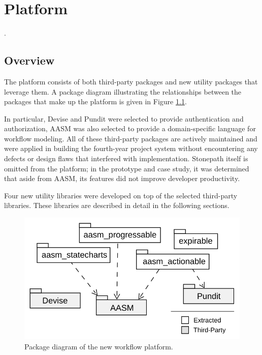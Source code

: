 \documentclass[document.tex]{subfiles}
\begin{document}
\chapter{Platform}
\label {ch:platform}

.

\section {Overview}


The platform consists of both third-party packages and new utility packages that leverage them. A package diagram illustrating the relationships between the packages that make up the platform is given in Figure \ref{fig:platform-package-diagram}.

In particular, Devise and Pundit were selected to provide authentication and authorization, AASM was also selected to provide a domain-specific language for workflow modeling. All of these third-party packages are actively maintained and were applied in building the fourth-year project system without encountering any defects or design flaws that interfered with implementation. Stonepath itself is omitted from the platform; in the prototype and case study, it was determined that aside from AASM, its features did not improve developer productivity. 

Four new utility libraries were developed on top of the selected third-party libraries. These libraries are described in detail in the following sections.

\begin{figure}[!ht]
\centering \includegraphics[width=4.5in]{./img/platform/platform-package-diagram}
\caption{Package diagram of the new workflow platform.}
\label{fig:platform-package-diagram}
\end{figure}
\end{document}
